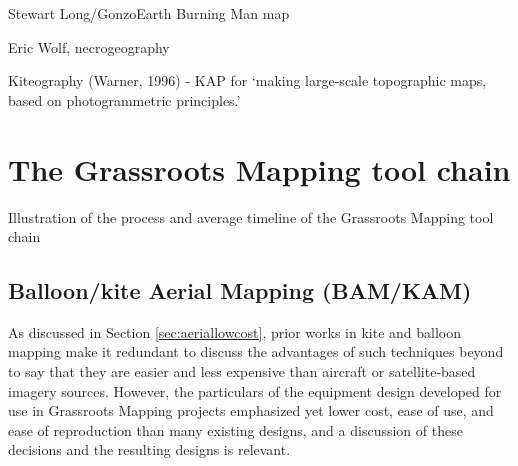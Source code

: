 \documentclass[11pt]{report}
\begin{document}
Stewart Long/GonzoEarth Burning Man map

Eric Wolf, necrogeography

Kiteography (Warner, 1996) - KAP for `making large-scale topographic maps, based on photogrammetric principles.' \cite{vierling2006short}

\chapter{The Grassroots Mapping tool chain}
\label{chap:toolchain}
Illustration of the process and average timeline of the Grassroots Mapping tool chain

\section{Balloon/kite Aerial Mapping (BAM/KAM)}

As discussed in Section \ref{sec:aeriallowcost}, prior works in kite and balloon mapping make it redundant to discuss the advantages of such techniques beyond to say that they are easier and less expensive than aircraft or satellite-based imagery sources. However, the particulars of the equipment design developed for use in Grassroots Mapping projects emphasized yet lower cost, ease of use, and ease of reproduction than many existing designs, and a discussion of these decisions and the resulting designs is relevant. 
\end{document}

